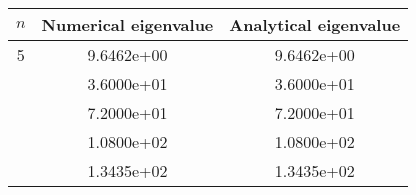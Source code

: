 \begin{table}  %
\begin{adjustbox}{width=\linewidth}
\begin{tabular}{||c | c | c||}
\hline
$n$ & Numerical eigenvalue & Analytical eigenvalue    \\ \hline
5 & 9.6462e+00 & 9.6462e+00    \\ \hline
  & 3.6000e+01 & 3.6000e+01    \\ \hline
  & 7.2000e+01 & 7.2000e+01    \\ \hline
  & 1.0800e+02 & 1.0800e+02    \\ \hline
  & 1.3435e+02 & 1.3435e+02    \\ \hline
\end{tabular}
\end{adjustbox}
\caption{}
\label{}
\end{table}
